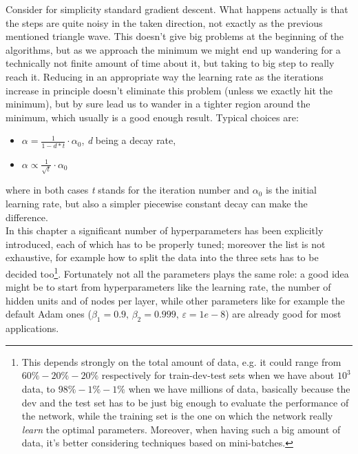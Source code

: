 \documentclass[12pt, a4paper]{report}
\theoremstyle{definition}
\begin{document}
{Consider for simplicity standard gradient descent. What happens actually is that the steps are quite noisy in the taken direction, not exactly as the previous mentioned triangle wave. This doesn't give big problems at the beginning of the algorithms, but as we approach the minimum we might end up wandering for a technically not finite amount of time about it, but taking to big step to really reach it. Reducing in an appropriate way the learning rate as the iterations increase in principle doesn't eliminate this problem (unless we exactly hit the minimum), but by sure lead us to wander in a tighter region around the minimum, which usually is a good enough result. Typical choices are:
\begin{itemize}
	\item $\alpha = \frac{1}{1-d*t}\cdot\alpha_0$, \textit{d} being a decay rate,
	\item $\alpha \propto \frac{1}{\sqrt{t}}\cdot\alpha_0$
\end{itemize}
where in both cases \textit{t} stands for the iteration number and $\alpha_0$ is the initial learning rate, but also a simpler piecewise constant decay can make the difference.\\
\newline \noindent In this chapter a significant number of hyperparameters has been explicitly introduced, each of which has to be properly tuned; moreover the list is not exhaustive, for example how to split the data into the three sets has to be decided too\footnote{This depends strongly on the total amount of data, e.g. it could range from $60\%-20\%-20\%$ respectively for train-dev-test sets when we have about $10^3$ data, to $98\%-1\%-1\%$ when we have millions of data, basically because the dev and the test set has to be just big enough to evaluate the performance of the network, while the training set is the one on which the network really \textit{learn} the optimal parameters. Moreover, when having such a big amount of data, it's better considering techniques based on mini-batches.}. Fortunately not all the parameters plays the same role: a good idea might be to start from hyperparameters like the learning rate, the number of hidden units and of nodes per layer, while other parameters like for example the default Adam ones ($\beta_1=0.9,\,\beta_2=0.999,\,\varepsilon=1e-8$) are already good for most applications. 





}
\end{document}
